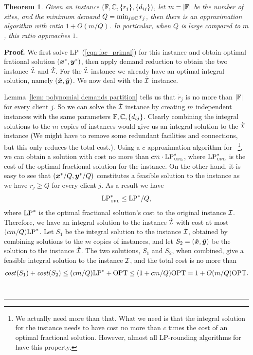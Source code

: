 \documentclass[oneside,final]{ucr}
\newtheorem{theorem}{Theorem}
\newenvironment{proof}[1][Proof]{\textbf{#1.} }{\ \rule{0.5em}{0.5em}}
\begin{document}
\begin{theorem}
  \label{thm:largeR}
  Given an {\FTFP} instance $(\mathbb{F}, \mathbb{C}, \{r_j\}
  , \{d_{ij}\})$, let $m = |\mathbb{F}|$ be the number of
sites, and the minimum demand $Q = \min_{j\in\mathbb{C}}
r_j$, then there is an approximation algorithm with ratio $1
+ O(m/Q)$. In particular, when $Q$ is large compared to $m$,
this ratio approaches $1$.
\end{theorem}
\begin{proof}
  We first solve LP~(\ref{eqn:fac_primal}) for this instance
  and obtain optimal frational solution $(\boldsymbol{x}^\ast,
  \boldsymbol{y}^\ast)$, then apply demand reduction to obtain the two
  instance $\hat {\mathcal{I}}$ and $\dot {\mathcal{I}}$. For the $\hat
  {\mathcal{I}}$ instance we already have an optimal integral
  solution, namely $(\hat{\boldsymbol{x}},\hat{\boldsymbol{y}})$. We now deal with
  the $\dot{\mathcal{I}}$ instance.

  Lemma~\ref{lem: polynomial demands partition} tells us
  that $\dot r_j$ is no more than $|\mathbb{F}|$ for every
  client $j$. So we can solve the $\dot {\mathcal{I}}$ instance by
  creating $m$ independent {\UFL} instances with the same
  parameters $\mathbb{F}, \mathbb{C}, \{d_{ij}\}$. Clearly
  combining the integral solutions to the $m$ copies of
  {\UFL} instances would give us an integral solution to the
  $\dot {\mathcal{I}}$ instance (We might have to remove some
  redundant facilities and connections, but this only
  reduces the total cost.). Using a $c$-approximation
  algorithm for {\UFL}~\footnote{We actually need more than
    that. What we need is that the integral solution for the
    {\UFL} instance needs to have cost no more than $c$
    times the cost of an optimal fractional
    solution. However, almost all LP-rounding algorithms for
    {\UFL} have this property.}, we can obtain a solution
  with cost no more than $c m \cdot \mbox{\rm LP}_{\mbox{\tiny\rm UFL}}^\ast$,
  where $\mbox{\rm LP}_{\mbox{\tiny\rm UFL}}^\ast$ is the cost of the optimal
  fractional solution for the {\UFL} instance. On the other
  hand, it is easy to see that $(\boldsymbol{x}^\ast/Q,\boldsymbol{y}^\ast/Q)$
  constitutes a feasible solution to the {\UFL} instance as
  we have $r_j \geq Q$ for every client $j$. As a result we
  have
  \begin{equation*}
    \mbox{\rm LP}_{\mbox{\tiny\rm UFL}}^\ast \leq \mbox{\rm LP}^\ast / Q,
  \end{equation*}
  where $\mbox{\rm LP}^\ast$ is the optimal fractional solution's cost
  to the original {\FTFP} instance $\mathcal{I}$. Therefore, we
  have an integral solution to the instance $\dot{\mathcal{I}}$ with
  cost at most $(cm/Q) \mbox{\rm LP}^\ast$. Let $S_1$ be the integral
  solution to the instance $\dot{\mathcal{I}}$, obtained by
  combining solutions to the $m$ copies of {\UFL} instances,
  and let $S_2 = (\hat{\boldsymbol{x}},\hat{\boldsymbol{y}})$ be the solution to the
  instance $\hat{\mathcal{I}}$. The two solutions, $S_1$ and $S_2$,
  when combined, give a feasible integral solution to the
  instance $\mathcal{I}$, and the total cost is no more than
  \begin{equation*}
    {\it cost}(S_1) + {\it cost}(S_2) \leq (cm/Q) \mbox{\rm LP}^\ast + \mbox{\rm OPT} \leq (1 +
    cm/Q) \mbox{\rm OPT} = 1 + O(m/Q) \mbox{\rm OPT}.
  \end{equation*}
\end{proof}
\end{document}
